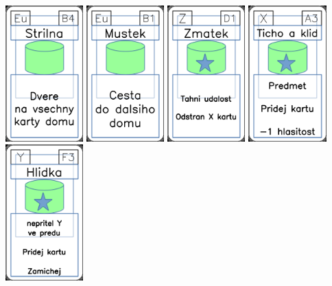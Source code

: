 \documentclass[a4paper]{article}
\begin{document}
	\includegraphics[width=3.0cm]{img-4_38}
	\includegraphics[width=3.0cm]{img-4_35}
	\includegraphics[width=3.0cm]{img-5_45}
	\includegraphics[width=3.0cm]{img-5_2}
	\includegraphics[width=3.0cm]{img-5_27}
\end{document}
